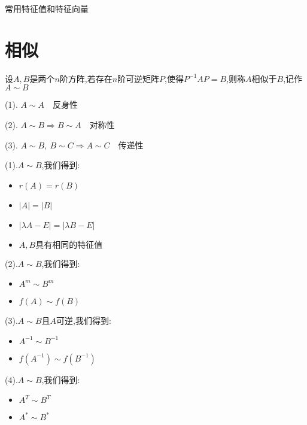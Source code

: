 \begin{table}[h]
	\centering
	\caption{常用特征值和特征向量}
	\label{table: 常用特征值和特征向量}
\end{table}
\section{相似}
\begin{definition}[矩阵的相似]
	设$A,B$是两个$n$阶方阵,若存在$n$阶可逆矩阵$P$,使得$P^{-1}AP=B$,则称$A$相似于$B$,记作$A\sim B$
	\begin{anymark}[注]
		(1). $A\sim A\quad \text{反身性}$
		
		(2). $A\sim B\Rightarrow B\sim A\quad \text{对称性}$
		
		(3). $A\sim B,\ B\sim C\Rightarrow A\sim C\quad \text{传递性}$
	\end{anymark}
	\begin{corollary}[相似矩阵]
		(1).$A\sim B$,我们得到:  
		\begin{itemize}
			\item $r(A)=r(B)$
			\item $|A|=|B|$
			\item $|\lambda A-E|=|\lambda B-E|$
			\item $A,B\text{具有相同的特征值}$
		\end{itemize}
		
		(2).$A\sim B$,我们得到:  
		\begin{itemize}
			\item $A^{m}\sim B^{m}$
			\item $f(A)\sim f(B)$
		\end{itemize}
		
		(3).$A\sim B\text{且}A\text{可逆}$,我们得到:  
		\begin{itemize}
			\item $A^{-1}\sim B^{-1}$
			\item $f(A^{-1})\sim f(B^{-1})$
		\end{itemize}
		
		(4).$A\sim B$,我们得到:  
		\begin{itemize}
			\item $A^{T}\sim B^{T}$
			\item $A^{*}\sim B^{*}$
		\end{itemize}
	\end{corollary}
\end{definition}

